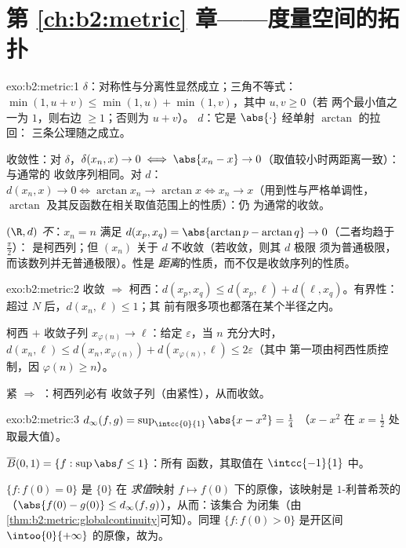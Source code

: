 \section*{第 \ref{ch:b2:metric} 章——度量空间的拓扑}

\begin{solution}{exo:b2:metric:1}
$\delta$：对称性与分离性显然成立；三角不等式：
$\min(1, u + v) \leq \min(1,u) + \min(1,v)$，其中 $u, v \geq 0$（若
两个最小值之一为 $1$，则右边 $\geq 1$；否则为 $u + v$）。
$d$：它是 $\abs{\cdot}$ 经单射 $\arctan$ 的拉回：
三条公理随之成立。

收敛性：对 $\delta$，$\delta(x_n, x) \to 0 \iff \abs{x_n - x}
\to 0$（取值较小时两距离一致）：与通常的
收敛序列相同。对 $d$：$d(x_n, x) \to 0 \iff \arctan x_n \to
\arctan x \iff x_n \to x$（用到性与严格单调性，
$\arctan$ 及其反函数在相关取值范围上的性质）：仍
为通常的收敛。

$(\R, d)$ \emph{不}：$x_n = n$ 满足 $d(x_p, x_q)
= \abs{\arctan p - \arctan q} \to 0$（二者均趋于 $\frac\pi2$）：
是柯西列；但 $(x_n)$ 关于 $d$ 不收敛（若收敛，则其 $d$ 极限
须为普通极限，而该数列并无普通极限）。性是
\emph{距离}的性质，而不仅是收敛序列的性质。
\end{solution}

\begin{solution}{exo:b2:metric:2}
收敛 $\Rightarrow$ 柯西：$d(x_p, x_q) \leq d(x_p, \ell) +
d(\ell, x_q)$。有界性：超过 $N$ 后，$d(x_n, \ell) \leq 1$；其
前有限多项也都落在某个半径之内。

柯西 $+$ 收敛子列 $x_{\varphi(n)} \to \ell$：给定
$\varepsilon$，当 $n$ 充分大时，$d(x_n, \ell) \leq d(x_n,
x_{\varphi(n)}) + d(x_{\varphi(n)}, \ell) \leq 2\varepsilon$（其中
第一项由柯西性质控制，因 $\varphi(n) \geq n$）。

紧 $\Rightarrow$ ：柯西列必有
收敛子列（由紧性），从而收敛。
\end{solution}

\begin{solution}{exo:b2:metric:3}
$d_\infty(f, g) = \sup_{\intcc{0}{1}} \abs{x - x^2} = \frac14$
（$x - x^2$ 在 $x = \frac12$ 处取最大值）。

$\overline B(0, 1) = \{f : \sup\abs f \leq 1\}$：所有
函数，其取值在 $\intcc{-1}{1}$ 中。

$\{f : f(0) = 0\}$ 是 $\{0\}$ 在
\emph{求值}映射 $f \mapsto f(0)$ 下的原像，该映射是 $1$-利普希茨的
（$\abs{f(0) - g(0)} \leq d_\infty(f,g)$），从而：该集合
为闭集（由\cref{thm:b2:metric:globalcontinuity}可知）。同理 $\{f :
f(0) > 0\}$ 是开区间 $\intoo{0}{+\infty}$ 的原像，故为。
\end{solution}

